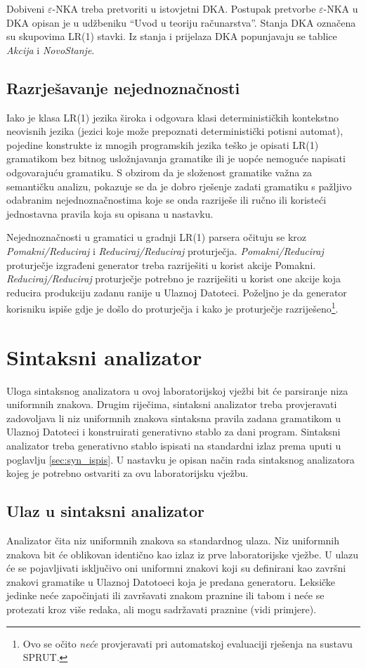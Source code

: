 \documentclass[times, 12pt, utf8]{book}
\begin{document}
Dobiveni $\varepsilon$-NKA treba pretvoriti u istovjetni DKA.
Postupak pretvorbe $\varepsilon$-NKA u DKA opisan je u udžbeniku “Uvod u teoriju računarstva”.
Stanja DKA označena su skupovima LR(1) stavki.
Iz stanja i prijelaza DKA popunjavaju se tablice {\em Akcija} i {\em NovoStanje}.

\subsection{Razrješavanje nejednoznačnosti}
Iako je klasa LR(1) jezika široka i odgovara klasi determinističkih kontekstno neovisnih jezika (jezici koje može prepoznati deterministički potisni automat), pojedine konstrukte iz mnogih programskih jezika teško je opisati LR(1) gramatikom bez bitnog usložnjavanja gramatike ili je uopće nemoguće napisati odgovarajuću gramatiku.
S obzirom da je složenost gramatike važna za semantičku analizu, pokazuje se da je dobro rješenje zadati gramatiku s pažljivo odabranim nejednoznačnostima koje se onda razriješe ili ručno ili koristeći jednostavna pravila koja su opisana u nastavku.

Nejednoznačnosti u gramatici u gradnji LR(1) parsera očituju se kroz {\em Pomakni/Reduciraj} i {\em Reduciraj/Reduciraj} proturječja.
{\em Pomakni/Reduciraj} proturječje izgrađeni generator treba razriješiti u korist akcije Pomakni.
{\em Reduciraj/Reduciraj} proturječje potrebno je razriješiti u korist one akcije koja reducira produkciju zadanu ranije u Ulaznoj Datoteci.
Poželjno je da generator korisniku ispiše gdje je došlo do proturječja i kako je proturječje razriješeno\footnote{Ovo se očito \emph{neće} provjeravati pri automatskoj evaluaciji rješenja na sustavu SPRUT.}.

\section{Sintaksni analizator}
Uloga sintaksnog analizatora u ovoj laboratorijskoj vježbi bit će parsiranje niza uniformnih znakova.
Drugim riječima, sintaksni analizator treba provjeravati zadovoljava li niz uniformnih znakova sintaksna pravila zadana gramatikom u Ulaznoj Datoteci i konstruirati generativno stablo za dani program.
Sintaksni analizator treba generativno stablo ispisati na standardni izlaz prema uputi u poglavlju \ref{sec:syn_ispis}.
U nastavku je opisan način rada sintaksnog analizatora kojeg je potrebno ostvariti za ovu laboratorijsku vježbu.

\subsection{Ulaz u sintaksni analizator}
Analizator čita niz uniformnih znakova sa standardnog ulaza.
Niz uniformnih znakova bit će oblikovan identično kao izlaz iz prve laboratorijske vježbe.
U ulazu će se pojavljivati isključivo oni uniformni znakovi koji su definirani kao završni znakovi gramatike u Ulaznoj Datotoeci koja je predana generatoru.
Leksičke jedinke neće započinjati ili završavati znakom praznine ili tabom i neće se protezati kroz više redaka, ali mogu sadržavati praznine (vidi primjere).
\end{document}
